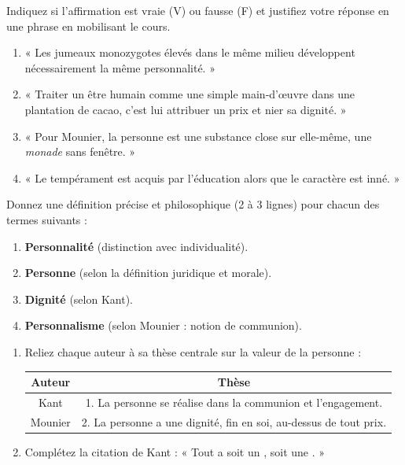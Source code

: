 \documentclass[11pt]{article}
\begin{document}
\begin{exercice}
Indiquez si l'affirmation est vraie (V) ou fausse (F) et justifiez votre réponse en une phrase en mobilisant le cours.
\begin{enumerate}
    \item « Les jumeaux monozygotes élevés dans le même milieu développent nécessairement la même personnalité. »
    \item « Traiter un être humain comme une simple main-d'œuvre dans une plantation de cacao, c'est lui attribuer un prix et nier sa dignité. »
    \item « Pour Mounier, la personne est une substance close sur elle-même, une \emph{monade} sans fenêtre. »
    \item « Le tempérament est acquis par l'éducation alors que le caractère est inné. »
\end{enumerate}
\end{exercice}

\begin{exercice}
Donnez une définition précise et philosophique (2 à 3 lignes) pour chacun des termes suivants :
\begin{enumerate}
    \item \textbf{Personnalité} (distinction avec individualité).
    \item \textbf{Personne} (selon la définition juridique et morale).
    \item \textbf{Dignité} (selon Kant).
    \item \textbf{Personnalisme} (selon Mounier : notion de communion).
\end{enumerate}
\end{exercice}

\begin{exercice}
\begin{enumerate}
    \item Reliez chaque auteur à sa thèse centrale sur la valeur de la personne :
    \begin{center}
        \begin{tabular}{|c|c|}
        \hline
        \textbf{Auteur} & \textbf{Thèse} \\ \hline
        Kant & 1. La personne se réalise dans la communion et l'engagement. \\ \hline
        Mounier & 2. La personne a une dignité, fin en soi, au-dessus de tout prix. \\ \hline
        \end{tabular}
    \end{center}
    \item Complétez la citation de Kant : « Tout a soit un \underline{\hspace{3cm}}, soit une \underline{\hspace{3cm}}. »
\end{enumerate}
\end{exercice}
\end{document}
